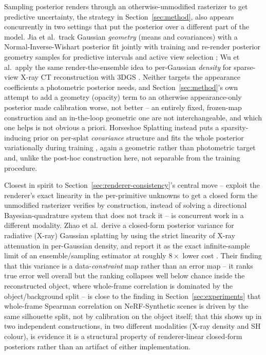 \documentclass[letterpaper,10pt,conference]{ieeeconf}
\begin{document}
Sampling posterior renders through an otherwise-unmodified rasterizer to get
predictive uncertainty, the strategy in Section~\ref{sec:method}, also
appears concurrently in two settings that put the posterior over a different
part of the model. Jia et al.\ track Gaussian \emph{geometry} (means and
covariances) with a Normal-Inverse-Wishart posterior fit jointly with
training and re-render posterior geometry samples for predictive intervals
and active view selection \cite{jia2026rendering}; Wu et al.\ apply the same
render-the-ensemble idea to per-Gaussian \emph{density} for sparse-view X-ray
CT reconstruction with 3DGS \cite{wu2026perturbed}. Neither targets the
appearance coefficients a photometric posterior needs, and Section~\ref{sec:method}'s
own attempt to add a geometry (opacity) term to an otherwise appearance-only
posterior made calibration worse, not better -- an entirely fixed,
frozen-map construction and an in-the-loop geometric one are not
interchangeable, and which one helps is not obvious a priori. Horseshoe
Splatting instead puts a sparsity-inducing prior on per-splat \emph{covariance}
structure and fits the whole posterior variationally during training
\cite{wu2026horseshoe}, again a geometric rather than photometric target and,
unlike the post-hoc construction here, not separable from the training
procedure.

Closest in spirit to Section~\ref{sec:renderer-consistency}'s central move
-- exploit the renderer's exact linearity in the per-primitive unknowns to
get a closed form the unmodified rasterizer verifies by construction,
instead of solving a directional Bayesian-quadrature system that does not
track it -- is concurrent work in a different modality. Zhao et al.\ derive
a closed-form posterior variance for radiative (X-ray) Gaussian splatting by
using the strict linearity of X-ray attenuation in per-Gaussian density, and
report it as the exact infinite-sample limit of an ensemble/sampling
estimator at roughly $8\times$ lower cost \cite{zhao2026posterior}. Their
finding that this variance is a data-\emph{constraint} map rather than an
error map -- it ranks true error well overall but the ranking collapses well
below chance inside the reconstructed object, where whole-frame correlation
is dominated by the object/background split -- is close to the finding in
Section~\ref{sec:experiments} that whole-frame Spearman correlation on
NeRF-Synthetic scenes is driven by the same silhouette split, not by
calibration on the object itself; that this shows up in two independent
constructions, in two different modalities (X-ray density and SH colour),
is evidence it is a structural property of renderer-linear closed-form
posteriors rather than an artifact of either implementation.
\end{document}
